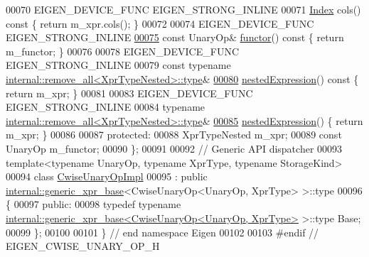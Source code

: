 \begin{DoxyCode}
00070     EIGEN\_DEVICE\_FUNC EIGEN\_STRONG\_INLINE
00071     \hyperlink{namespace_eigen_a62e77e0933482dafde8fe197d9a2cfde}{Index} cols()\textcolor{keyword}{ const }\{ \textcolor{keywordflow}{return} m\_xpr.cols(); \}
00072 
00074     EIGEN\_DEVICE\_FUNC EIGEN\_STRONG\_INLINE
\hyperlink{group___core___module_ac02eff03893317021760f7d093c4ab9d}{00075}     \textcolor{keyword}{const} UnaryOp& \hyperlink{group___core___module_ac02eff03893317021760f7d093c4ab9d}{functor}()\textcolor{keyword}{ const }\{ \textcolor{keywordflow}{return} m\_functor; \}
00076 
00078     EIGEN\_DEVICE\_FUNC EIGEN\_STRONG\_INLINE
00079     \textcolor{keyword}{const} \textcolor{keyword}{typename} \hyperlink{group___sparse_core___module}{internal::remove\_all<XprTypeNested>::type}&
\hyperlink{group___core___module_a25d4402be360cf0b8ff867863da46c7d}{00080}     \hyperlink{group___core___module_a25d4402be360cf0b8ff867863da46c7d}{nestedExpression}()\textcolor{keyword}{ const }\{ \textcolor{keywordflow}{return} m\_xpr; \}
00081 
00083     EIGEN\_DEVICE\_FUNC EIGEN\_STRONG\_INLINE
00084     \textcolor{keyword}{typename} \hyperlink{group___sparse_core___module}{internal::remove\_all<XprTypeNested>::type}&
\hyperlink{group___core___module_a2efe6055ea94b65c29dcf1cdcbd7e17e}{00085}     \hyperlink{group___core___module_a2efe6055ea94b65c29dcf1cdcbd7e17e}{nestedExpression}() \{ \textcolor{keywordflow}{return} m\_xpr; \}
00086 
00087   \textcolor{keyword}{protected}:
00088     XprTypeNested m\_xpr;
00089     \textcolor{keyword}{const} UnaryOp m\_functor;
00090 \};
00091 
00092 \textcolor{comment}{// Generic API dispatcher}
00093 \textcolor{keyword}{template}<\textcolor{keyword}{typename} UnaryOp, \textcolor{keyword}{typename} XprType, \textcolor{keyword}{typename} StorageKind>
00094 \textcolor{keyword}{class }\hyperlink{class_eigen_1_1_cwise_unary_op_impl}{CwiseUnaryOpImpl}
00095   : \textcolor{keyword}{public} \hyperlink{struct_eigen_1_1internal_1_1generic__xpr__base}{internal::generic\_xpr\_base}<CwiseUnaryOp<UnaryOp, XprType> >::type
00096 \{
00097 \textcolor{keyword}{public}:
00098   \textcolor{keyword}{typedef} \textcolor{keyword}{typename} \hyperlink{struct_eigen_1_1internal_1_1generic__xpr__base}{internal::generic\_xpr\_base<CwiseUnaryOp<UnaryOp, XprType>}
       >::type Base;
00099 \};
00100 
00101 \} \textcolor{comment}{// end namespace Eigen}
00102 
00103 \textcolor{preprocessor}{#endif // EIGEN\_CWISE\_UNARY\_OP\_H}
\end{DoxyCode}
